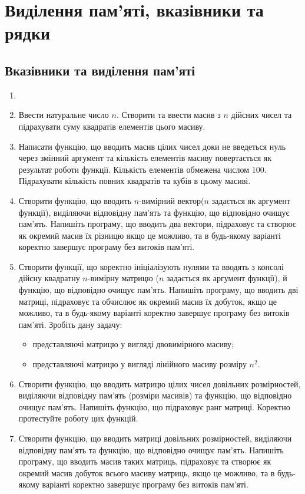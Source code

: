 \documentclass[]{article}
\begin{document}
\section{Виділення пам'яті, вказівники та рядки}

\subsection{Вказівники та виділення пам'яті}

\begin{enumerate}

\item
\item
  Ввести натуральне число $n$. Створити та ввести масив з $n$ дійсних чисел та
  підрахувати суму квадратів елементів цього масиву. 

\item
  Написати функцію, що вводить масив цілих чисел доки не введеться нуль
  через змінний аргумент та кількість елементів масиву повертається як
  результат роботи функції. Кількість елементів обмежена числом 100.
  Підрахувати кількість повних квадратів та кубів в цьому масиві.
\item
  Створити функцію, що вводить $n$-вимірний вектор($n$
  задається як аргумент функції), виділяючи відповідну
  пам'ять та функцію, що відповідно очищує пам'ять. Напишіть програму,
  що вводить два вектори, підраховує та створює як окремий масив їх
  різницю якщо це можливо, та в будь-якому варіанті коректно
  завершує програму без витоків пам'яті.
\item
  Створити функції, що коректно ініціалізують нулями та вводять з консолі 
дійсну квадратну $n$-вимірну матрицю ($n$ задається як аргумент функції), й
  функцію, що відповідно очищує пам'ять. Напишіть програму, що вводить
  дві матриці, підраховує та обчислює як окремий масив їх добуток, якщо
  це можливо, та в будь-якому варіанті коректно завершує програму без
  витоків пам'яті. Зробіть дану задачу:
  \begin{itemize}
  \item
представляючі матрицю у вигляді двовимірного масиву;
  \item
представляючі матрицю у вигляді лінійного масиву розміру $n^{2}$.
 \end{itemize}

\item
  Створити функцію, що вводить матрицю цілих чисел довільних
  розмірностей, виділяючи відповідну пам'ять (розміри масивів) та
  функцію, що відповідно очищує пам'ять. Напишіть функцію, що підраховує
  ранг матриці. Коректно протестуйте роботу цих функцій.
\item
  Створити функцію, що вводить матриці довільних розмірностей, виділяючи
  відповідну пам'ять та функцію, що відповідно очищує пам'ять. Напишіть
  програму, що вводить масив таких матриць, підраховує та створює як
  окремий масив добуток всього масиву матриць, якщо це можливо, та в
  будь-якому варіанті коректно завершує програму без витоків пам'яті.


\end{enumerate}
\end{document}
